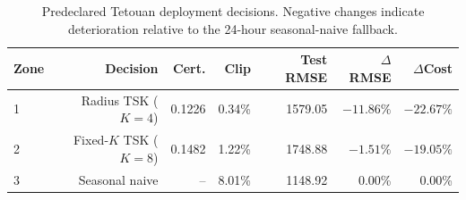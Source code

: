 \begin{table}[t]
\centering
\caption{Predeclared Tetouan deployment decisions. Negative changes indicate deterioration relative to the 24-hour seasonal-naive fallback.}
\label{tab:energy_decisions_v3}
\begin{tabular}{lrrrrrr}
\hline
Zone & Decision & Cert. & Clip & Test RMSE & $\Delta$RMSE & $\Delta$Cost \\
\hline
1 & Radius TSK ($K=4$) & 0.1226 & 0.34\% & 1579.05 & $-11.86\%$ & $-22.67\%$ \\
2 & Fixed-$K$ TSK ($K=8$) & 0.1482 & 1.22\% & 1748.88 & $-1.51\%$ & $-19.05\%$ \\
3 & Seasonal naive & -- & 8.01\% & 1148.92 & 0.00\% & 0.00\% \\
\hline
\end{tabular}
\end{table}
